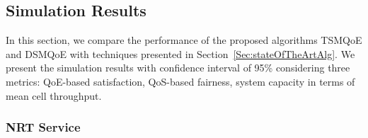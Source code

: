 \documentclass[12pt]{article}
\newcommand{\SecRef}[1]{Section~\ref{#1}}
\begin{document}
\subsection{Simulation Results}
\label{Sec:Results}

In this section, we compare the performance of the proposed algorithms TSMQoE and DSMQoE with techniques presented in \SecRef{Sec:stateOfTheArtAlg}. We present the simulation results with confidence interval of 95\% considering three metrics: \ac{QoE}-based satisfaction, \ac{QoS}-based fairness, system capacity in terms of mean cell throughput.

\subsubsection{NRT Service}
\end{document}
